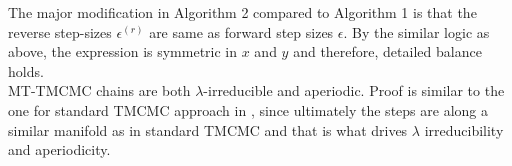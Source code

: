 The major modification in Algorithm 2 compared to Algorithm 1 is that the reverse step-sizes $\epsilon^{(r)}$ are same as forward step sizes $\epsilon$. By the similar logic as above, the expression is symmetric in $x$ and $y$ and therefore, detailed balance holds. \\[3 pt]

MT-TMCMC chains are both $\lambda$-irreducible and aperiodic. Proof is similar to the one for standard TMCMC approach in \cite{Dey2015}, since ultimately the steps are along a similar manifold as in standard TMCMC and that is what drives $\lambda$ irreducibility and aperiodicity. 



 


